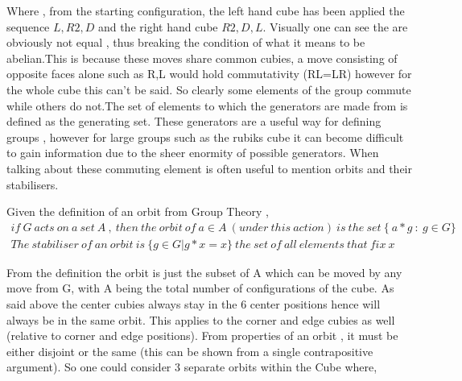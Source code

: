 \documentclass{article}
\begin{document}
\vspace{-30pt}
\begin{figure}[h]
\centering
\begin{minipage}{3cm}%
%
\end{minipage}%
\end{figure}
\vspace{20pt}
Where , from the starting configuration, the left hand cube has been applied the sequence ${L,R2,D}$ and the right hand cube ${R2,D,L}$. Visually one can see the are obviously not equal , thus breaking the condition of what it means to be abelian.This is because these moves share common cubies, a move consisting of opposite faces alone such as R,L would hold commutativity (RL=LR) however for the whole cube this can't be said. So clearly some elements of the group commute while others do not.\newline The set of elements to which the generators are made from is defined as the generating set. These generators are a useful way for defining groups , however for large groups such as the rubiks cube it can become difficult to gain information due to the sheer enormity of possible generators. When talking about these commuting element is often useful to mention orbits and their stabilisers. 

Given the definition of an orbit from Group Theory ,
\begin{equation}
\begin{aligned}
if\ G\ acts\ on\ a\ set\ A\ ,\ then\ the\ orbit\ of\ a \in A\ (under\ this\ action)\ is\ the\ set\ \{\ a*g\ :\ g \in G\} \\
The\ stabiliser\ of\ an\ orbit\ is\ \{g\in G | g*x = x\}\ the\ set\ of\ all\ elements\ that\ fix\ x
\end{aligned}
\end{equation}

From the definition the orbit is just the subset of A which can be moved by any move from G, with A being the total number of configurations of the cube. As said above the center cubies always stay in the 6 center positions hence will always be in the same orbit. This applies to the corner and edge cubies as well (relative to corner and edge positions). 
From properties of an orbit , it must be either disjoint or the same (this can be shown from a single contrapositive argument). So one could consider 3 separate orbits within the Cube where,
\end{document}
